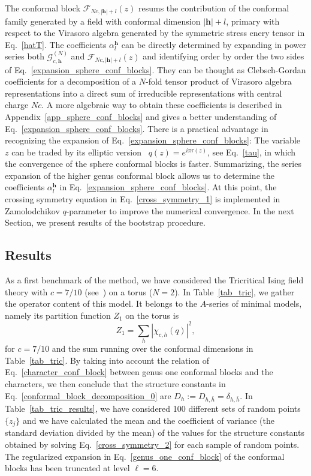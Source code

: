 \documentclass[a4paper,11pt]{article}
\begin{document}
 The conformal block   $\mathcal{F}_{Nc, |\boldsymbol{h}|+l}(z)$ resums the contribution of the conformal family generated by a field with conformal dimension $|\boldsymbol{h}|+l$, primary with respect to the Virasoro algebra generated by the symmetric stress enery tensor in Eq.~\eqref{hatT}. The coefficients $\alpha_l^{\boldsymbol{h}}$
can be directly determined by expanding in power series both $\mathcal{G}_{c, \boldsymbol{h}}^{(N)}$ 
and $\mathcal{F}_{Nc, |\boldsymbol{h}|+l}(z)$ and identifying order by order the two 
sides of Eq.~\eqref{expansion_sphere_conf_blocks}. 
They can be thought as Clebsch-Gordan coefficients for a decomposition of a $N$-fold  tensor product of Virasoro algebra representations into a direct sum of irreducible representations with central charge $Nc$. A more algebraic way to obtain 
these coefficients is described in Appendix~\ref{app_sphere_conf_blocks} and 
gives a better understanding of Eq.~\eqref{expansion_sphere_conf_blocks}. There is a practical 
advantage in recognizing the expansion of Eq.~\eqref{expansion_sphere_conf_blocks}: The variable $z$ 
can be traded by its elliptic version~\cite{Zamolodchikov} $q(z)=e^{i\pi \tau(z)}$, see Eq.~\eqref{tau}, in which the convergence of the 
sphere conformal blocks is faster. Summarizing, the series expansion of the higher genus conformal block allows us to determine the coefficients $\alpha_{l}^{\boldsymbol{h}}$ in Eq.~\eqref{expansion_sphere_conf_blocks}. At this point,  the crossing symmetry equation in Eq.~\eqref{cross_symmetry_1} is implemented in Zamolodchikov $q$-parameter to improve the numerical convergence. In the next Section, we present results of the bootstrap procedure.
\subsection{Results}

As a first benchmark of the method, we have considered the Tricritical 
Ising field theory with $c=7/10$ (see~\cite{Mussardo}) on a torus ($N=2$). 
In Table~\ref{tab_tric}, we gather the operator content
of this model. It belongs to the $A$-series of minimal models, namely  its partition function $Z_1$ on the torus is 
\begin{equation}
Z_1=\sum_{h}|\chi_{c,h}(q)|^2,
\end{equation}
for $c=7/10$ and the sum running over the conformal dimensions in Table~\ref{tab_tric}.
By taking into account the relation of Eq.~\eqref{character_conf_block} 
between genus one conformal blocks and the characters, we then  conclude that 
the structure constants in Eq.~\eqref{conformal_block_decomposition_0} are $D_h:= D_{h, \bar{h}}=\delta_{h, \bar{h}}$.  In Table~\ref{tab_tric_results}, we have considered 100 different sets of
random points $\{z_j\}$ and we have calculated the mean and 
the coefficient of  variance (the standard deviation divided by the mean) 
of the values for the structure constants obtained by solving Eq.~\eqref{cross_symmetry_2} 
for each sample of random points. The regularized expansion 
in Eq.~\eqref{genus_one_conf_block} of the conformal blocks has been truncated at level $\ell=6$.
\end{document}
